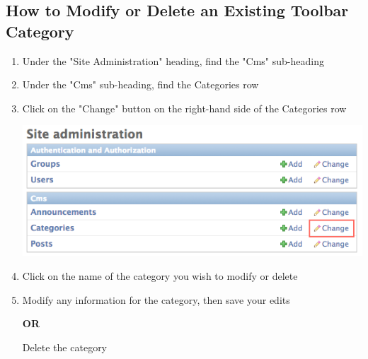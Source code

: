 \documentclass{article}
\begin{document}
\subsection*{How to Modify or Delete an Existing Toolbar Category}
\begin{enumerate}
	\item Under the "Site Administration" heading, find the "Cms" sub-heading
	\item Under the "Cms" sub-heading, find the Categories row
	\item Click on the "Change" button on the right-hand side of the Categories row
	
	\includegraphics[scale=0.45]{Categories-picture3.png}
	
	\item Click on the name of the category you wish to modify or delete
	\item Modify any information for the category, then save your edits
	
	\textbf{OR}
	
	Delete the category
	
\end{enumerate}
\end{document}
